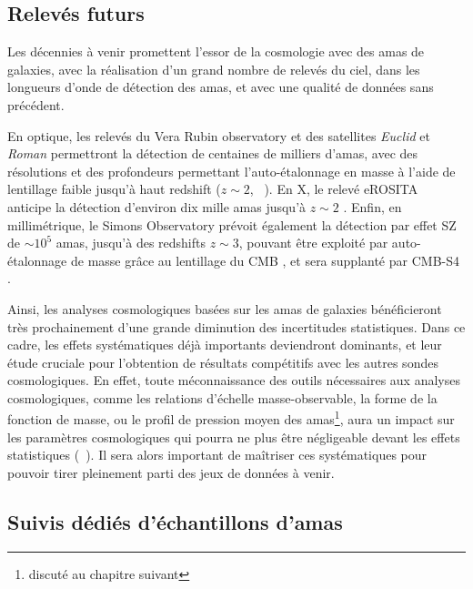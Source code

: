 \subsection{Relevés futurs}

Les décennies à venir promettent l'essor de la cosmologie avec des amas de galaxies, avec la réalisation d'un grand nombre de relevés du ciel, dans les longueurs d'onde de détection des amas, et avec une qualité de données sans précédent.

En optique, les relevés du Vera Rubin observatory et des satellites \textit{Euclid} et \textit{Roman} permettront la détection de centaines de milliers d'amas, avec des résolutions et des profondeurs permettant l'auto-étalonnage en masse à l'aide de lentillage faible jusqu'à haut redshift ($z \sim 2$, \eg\ \cite{lsst_science_collaboration_lsst_2009, sartoris_next_2016}).
En X, le relevé eROSITA anticipe la détection d'environ dix mille amas jusqu'à $z \sim 2$ \cite{merloni_erosita_2012}.
Enfin, en millimétrique, le Simons Observatory prévoit également la détection par effet SZ de $\sim 10^5$ amas, jusqu'à des redshifts $z \sim 3$, pouvant être exploité par auto-étalonnage de masse grâce au lentillage du CMB \cite{ade_simons_2019, louis_calibrating_2017}, et sera supplanté par CMB-S4 \cite{abazajian_cmb-s4_2016}.

Ainsi, les analyses cosmologiques basées sur les amas de galaxies bénéficieront très prochainement d'une grande diminution des incertitudes statistiques.
Dans ce cadre, les effets systématiques déjà importants deviendront dominants, et leur étude cruciale pour l'obtention de résultats compétitifs avec les autres sondes cosmologiques.
En effet, toute méconnaissance des outils nécessaires aux analyses cosmologiques, comme les relations d'échelle masse-observable, la forme de la fonction de masse, ou le profil de pression moyen des amas\footnote{discuté au chapitre suivant}, aura un impact sur les paramètres cosmologiques qui pourra ne plus être négligeable devant les effets statistiques (\eg\ \cite{ruppin_impact_2019, salvati_impact_2020, artis_impact_2021}).
Il sera alors important de maîtriser ces systématiques pour pouvoir tirer pleinement parti des jeux de données à venir.

\subsection{Suivis dédiés d'échantillons d'amas}\label{sec:follow_ups}

